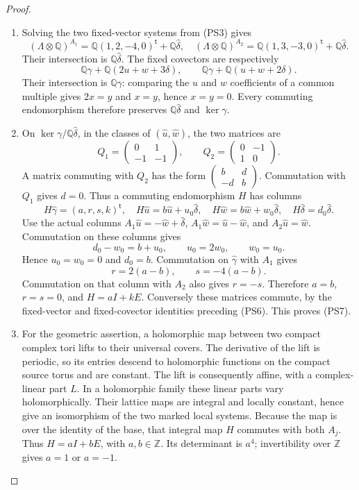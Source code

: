 \begin{proof}
\begin{enumerate}[label=\arabic*.,leftmargin=*]
\item Solving the two fixed-vector systems from (PS3) gives
\[
 (\Lambda\otimes\mathbb Q)^{A_1}
   =\mathbb Q(1,2,-4,0)^{\mathsf t}+\mathbb Q\widehat\delta,
 \quad
 (\Lambda\otimes\mathbb Q)^{A_2}
   =\mathbb Q(1,3,-3,0)^{\mathsf t}+\mathbb Q\widehat\delta.
\]
Their intersection is $\mathbb Q\widehat\delta$. The fixed covectors
are respectively
\[
 \mathbb Q\gamma+\mathbb Q(2u+w+3\delta),\qquad
 \mathbb Q\gamma+\mathbb Q(u+w+2\delta).
\]
Their intersection is $\mathbb Q\gamma$: comparing the $u$ and $w$
coefficients of a common multiple gives $2x=y$ and $x=y$, hence
$x=y=0$. Every commuting endomorphism therefore preserves
$\mathbb Q\widehat\delta$ and $\ker\gamma$.

\item On $\ker\gamma/\mathbb Q\widehat\delta$, in the classes of
$(\widehat u,\widehat w)$, the two matrices are
\[
 Q_1=\begin{pmatrix}0&1\\-1&-1\end{pmatrix},\qquad
 Q_2=\begin{pmatrix}0&-1\\1&0\end{pmatrix}.
\]
A matrix commuting with $Q_2$ has the form
$\left(\begin{smallmatrix}b&d\\-d&b\end{smallmatrix}\right)$.
Commutation with $Q_1$ gives $d=0$. Thus a commuting endomorphism $H$
has columns
\[
 H\widehat\gamma=(a,r,s,k)^{\mathsf t},\quad
 H\widehat u=b\widehat u+u_0\widehat\delta,\quad
 H\widehat w=b\widehat w+w_0\widehat\delta,\quad
 H\widehat\delta=d_0\widehat\delta.
\]
Use the actual columns $A_1\widehat u=-\widehat w+\widehat\delta$,
$A_1\widehat w=\widehat u-\widehat w$, and
$A_2\widehat u=\widehat w$. Commutation on these columns gives
\[
 d_0-w_0=b+u_0,\qquad u_0=2w_0,\qquad w_0=u_0.
\]
Hence $u_0=w_0=0$ and $d_0=b$. Commutation on
$\widehat\gamma$ with $A_1$ gives
\[
 r=2(a-b),\qquad s=-4(a-b).
\]
Commutation on that column with $A_2$ also gives $r=-s$.
Therefore $a=b$, $r=s=0$, and $H=aI+kE$. Conversely these matrices
commute, by the fixed-vector and fixed-covector identities preceding
(PS6). This proves (PS7).

\item For the geometric assertion, a holomorphic map between two compact
complex tori lifts to their universal covers. The derivative of the
lift is periodic, so its entries descend to holomorphic functions on
the compact source torus and are constant. The lift is consequently
affine, with a complex-linear part $L$. In a holomorphic family these
linear parts vary holomorphically. Their lattice maps are integral
and locally constant, hence give an isomorphism of the two marked
local systems. Because the map is over the identity of the base,
that integral map $H$ commutes with both $A_j$. Thus
$H=aI+bE$, with $a,b\in\mathbb Z$. Its determinant is $a^4$;
invertibility over $\mathbb Z$ gives $a=1$ or $a=-1$.


\end{enumerate}
\end{proof}
